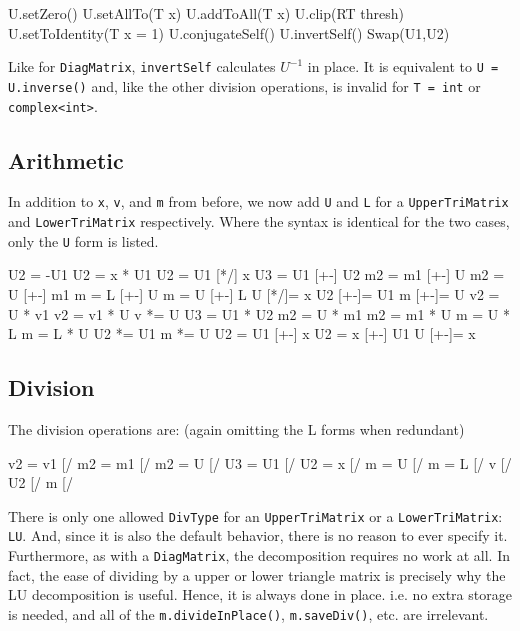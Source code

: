\documentclass[twoside,letterpaper,11pt]{article}
\renewcommand{\tt}[1]{{\lstinline {#1}}}
\begin{document}
\begin{tmvcode}
U.setZero()
U.setAllTo(T x)
U.addToAll(T x)
U.clip(RT thresh)
U.setToIdentity(T x = 1)
U.conjugateSelf()
U.invertSelf()
Swap(U1,U2)
\end{tmvcode}
Like for \tt{DiagMatrix}, \tt{invertSelf} calculates $U^{-1}$ in place.  
It is equivalent to \tt{U = U.inverse()} and, like the other division operations, is invalid for \tt{T = int} or \tt{complex<int>}.
\vspace{12pt}

\subsection{Arithmetic}
\label{TriMatrix_Arithmetic}

In addition to \tt{x}, \tt{v}, and \tt{m} from before, 
we now add \tt{U} and \tt{L} for a \tt{UpperTriMatrix}
and \tt{LowerTriMatrix} respectively.  Where the syntax is identical
for the two cases, only the \tt{U} form is listed.

\begin{tmvcode}
U2 = -U1
U2 = x * U1
U2 = U1 [*/] x
U3 = U1 [+-] U2
m2 = m1 [+-] U
m2 = U [+-] m1
m = L [+-] U
m = U [+-] L
U [*/]= x
U2 [+-]= U1
m [+-]= U
v2 = U * v1
v2 = v1 * U
v *= U
U3 = U1 * U2
m2 = U * m1
m2 = m1 * U
m = U * L
m = L * U
U2 *= U1
m *= U
U2 = U1 [+-] x
U2 = x [+-] U1
U [+-]= x
\end{tmvcode}

\subsection{Division}
\label{TriMatrix_Division}

The division operations are: (again omitting the L forms when redundant)
\begin{tmvcode}
v2 = v1 [/%
m2 = m1 [/%
m2 = U [/%
U3 = U1 [/%
U2 = x [/%
m = U [/%
m = L [/%
v [/%
U2 [/%
m [/%
\end{tmvcode}

There is only one allowed \tt{DivType} for an \tt{UpperTriMatrix} or a 
\tt{LowerTriMatrix}: \tt{LU}.
And, since it is also the default behavior,
there is no reason to ever specify it.
Furthermore, as with a \tt{DiagMatrix},
the decomposition requires no work at all.  In fact, the ease of dividing by a 
upper or lower triangle matrix is precisely why the LU decomposition is useful.
Hence, it is always done in place.  i.e. no extra storage is needed, and all of
the \tt{m.divideInPlace()}, \tt{m.saveDiv()}, etc. are irrelevant.
\end{document}
